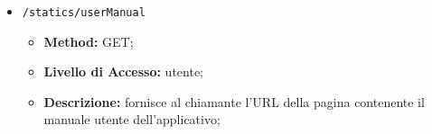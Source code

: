 \begin{itemize}
\begin{itemize}
\item \textbf{Response:}
\begin{lstlisting}[language=json,firstnumber=1]
{
"name": [nome del percorso]
"nodes" : [array \gloxy{JSON} di nodi, con attributi specificati nei diagrammi delle classi]
}
\end{lstlisting}
\end{itemize}
\item \texttt{/statics/userManual}
\begin{itemize}
\item \textbf{Method:} GET;
\item \textbf{Livello di Accesso:} utente;
\item \textbf{Descrizione:} fornisce al chiamante l'URL della pagina  contenente il manuale utente dell'applicativo;
\end{itemize}
\end{itemize}
